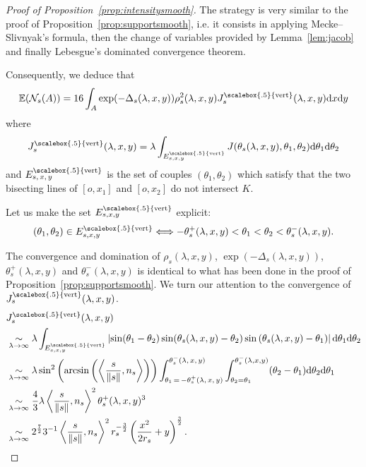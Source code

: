 \documentclass[AHL,Unicode,longabstracts,published]{cedram}
\newcommand{\cN}{\mathcal{N}}
\newcommand{\dd}{\mathrm{d}}
\newcommand{\E}{\mathbb{E}}
\DeclareMathOperator{\Vertt}{\scalebox{.5}{vert}}
\newcommand{\pass}{\vspace{0.3cm}\noindent}
\begin{document}
\begin{proof}[{{Proof of Proposition~\ref{prop:intensitysmooth}}}]
The strategy is very similar to the proof of Proposition~\ref{prop:supportsmooth}, i.e. it consists in applying Mecke--Slivnyak's formula, then the change of variables provided by Lemma~\ref{lem:jacob} and finally Lebesgue's dominated convergence theorem.

Consequently, we deduce that
\begin{align}\label{eq:calculintermcotes1}
\E(\cN_s(A)) = 16\int_{A}\exp(-\Delta_s(\lambda,x,y))\rho_s^2(\lambda,x,y)J^{\Vertt}_s(\lambda,x,y)\dd x \dd y
\end{align}
where
\begin{equation*}
J^{\Vertt}_s(\lambda,x,y) =\lambda\int_{E^{\Vertt}_{s,x,y}} J(\theta_s(\lambda,x,y),\theta_1,\theta_2)\dd \theta_1\dd \theta_2
\end{equation*}
and $E^{\Vertt}_{s,\,x,\,y}$ is the set of couples $(\theta_1,\theta_2)$ which satisfy that the two bisecting lines of $[o,x_1]$ and $[o,x_2]$ do not intersect $K$.

Let us make the set $E^{\Vertt}_{s,x,y}$ explicit:
\begin{equation}\label{eq:condangles}
(\theta_1,\theta_2)\in E^{\Vertt}_{s,x,y}\Longleftrightarrow -\theta_s^+(\lambda,x,y)< \theta_1<\theta_2<\theta_s^-(\lambda,x,y).
\end{equation}


The convergence and domination of $\rho_s(\lambda,x,y)$, $\exp(-\Delta_s(\lambda,x,y))$, $\theta_s^+(\lambda,x,y)$ and $\theta_s^-(\lambda,x,y)$ is identical to what has been done in the proof of Proposition~\ref{prop:supportsmooth}. We turn our attention to the convergence of $J^{\Vertt}_s(\lambda,x,y)$.
\begin{align}
&J^{\Vertt}_{s}(\lambda,x,y)\nonumber\\
& \underset{\lambda\to\infty}{\sim}\lambda \int_{E^{\Vertt}_{s,x,y}}\left|\sin(\theta_1-\theta_2)\sin(\theta_s(\lambda,x,y)-\theta_2)\sin\left(\theta_s(\lambda,x,y)-\theta_1\right)\right|
\dd \theta_1\dd \theta_2\nonumber\\
& \underset{\lambda\to\infty}{\sim} \lambda\sin^2\left(\arcsin\left(\left\langle \frac{s}{\|s\|},n_s\right\rangle\right)\right) \int_{\theta_1\,=\,-\theta_s^+(\lambda,\,x,\,y)}^{{\theta}_s^-(\lambda,\,x,\,y)}\int_{\theta_2=\theta_1}^{\theta_s^-(\lambda,x,y)}(\theta_2-\theta_1) \dd \theta_2 \dd\theta_1\nonumber\\
& \underset{\lambda\to\infty}{\sim} \frac{4}{3}\lambda \left\langle \frac{s}{\|s\|},n_s\right\rangle^2 \theta_s^+(\lambda,x,y)^3\nonumber\\
& \underset{\lambda\to\infty}{\sim} 2^{\frac{7}{2}}3^{-1}\left\langle \frac{s}{\|s\|},n_s\right\rangle^2 r_s^{-\frac{3}{2}}\left(\frac{x^2}{2r_s}+y\right)^{\frac{3}{2}}.\label{eq:convJbarre2}
\end{align}


\end{proof}
\end{document}
